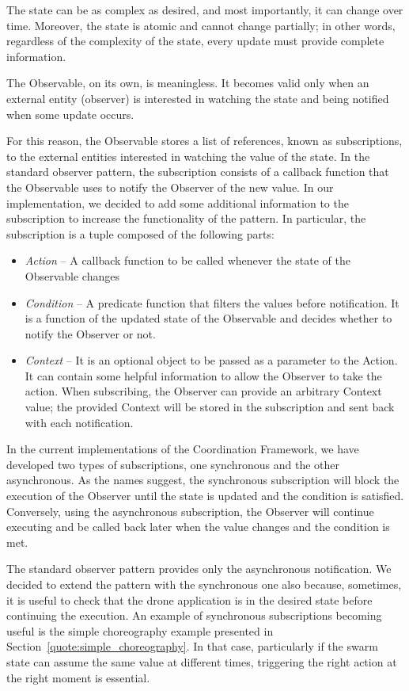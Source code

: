 The state can be as complex as desired, and most importantly, it can change over time. 
Moreover, the state is atomic and cannot change partially; in other words, regardless of the complexity of the state, every update must provide complete information.

The Observable, on its own, is meaningless. 
It becomes valid only when an external entity (observer) is interested in watching the state and being notified when some update occurs.

For this reason, the Observable stores a list of references, known as subscriptions, to the external entities interested in watching the value of the state. 
In the standard observer pattern, the subscription consists of a callback function that the Observable uses to notify the Observer of the new value.
In our implementation, we decided to add some additional information to the subscription to increase the functionality of the pattern.
In particular, the subscription is a tuple composed of the following parts:
\begin{itemize}
    \item \textit{Action} -- A callback function to be called whenever the state of the Observable changes
    \item \textit{Condition} -- A predicate function that filters the values before notification. It is a function of the updated state of the Observable and decides whether to notify the Observer or not. 
    \item \textit{Context} --  It is an optional object to be passed as a parameter to the Action. It can contain some helpful information to allow the Observer to take the action. 
    When subscribing, the Observer can provide an arbitrary Context value; the provided Context will be stored in the subscription and sent back with each notification.
\end{itemize}

In the current implementations of the Coordination Framework, we have developed two types of subscriptions, one synchronous and the other asynchronous. 
As the names suggest, the synchronous subscription will block the execution of the Observer until the state is updated and the condition is satisfied.
Conversely, using the asynchronous subscription, the Observer will continue executing and be called back later when the value changes and the condition is met.

The standard observer pattern provides only the asynchronous notification. 
We decided to extend the pattern with the synchronous one also because, sometimes, it is useful to check that the drone application is in the desired state before continuing the execution.
An example of synchronous subscriptions becoming useful is the simple choreography example presented in Section~\ref{quote:simple_choreography}.
In that case, particularly if the swarm state can assume the same value at different times, triggering the right action at the right moment is essential.


